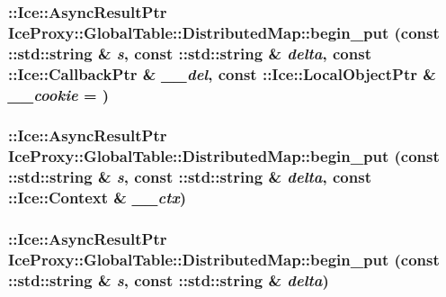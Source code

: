 \label{class_ice_proxy_1_1_global_table_1_1_distributed_map_a1f47f535d113d8ffad751119a6b7fbab}
\hypertarget{class_ice_proxy_1_1_global_table_1_1_distributed_map_a06f7ce73d60c5a24ffa4bd3f317b510b}{
\subsubsection[{begin\_\-put}]{\setlength{\rightskip}{0pt plus 5cm}::Ice::AsyncResultPtr IceProxy::GlobalTable::DistributedMap::begin\_\-put (const ::std::string \& {\em s}, \/  const ::std::string \& {\em delta}, \/  const ::Ice::CallbackPtr \& {\em \_\-\_\-del}, \/  const ::Ice::LocalObjectPtr \& {\em \_\-\_\-cookie} = {})}}
\label{class_ice_proxy_1_1_global_table_1_1_distributed_map_a06f7ce73d60c5a24ffa4bd3f317b510b}
\hypertarget{class_ice_proxy_1_1_global_table_1_1_distributed_map_a69018bd44d0fdfa426211d5f89c36d34}{
\subsubsection[{begin\_\-put}]{\setlength{\rightskip}{0pt plus 5cm}::Ice::AsyncResultPtr IceProxy::GlobalTable::DistributedMap::begin\_\-put (const ::std::string \& {\em s}, \/  const ::std::string \& {\em delta}, \/  const ::Ice::Context \& {\em \_\-\_\-ctx})}}
\label{class_ice_proxy_1_1_global_table_1_1_distributed_map_a69018bd44d0fdfa426211d5f89c36d34}
\hypertarget{class_ice_proxy_1_1_global_table_1_1_distributed_map_a3373fde3c2f8126148f819ff7dc10af6}{
\subsubsection[{begin\_\-put}]{\setlength{\rightskip}{0pt plus 5cm}::Ice::AsyncResultPtr IceProxy::GlobalTable::DistributedMap::begin\_\-put (const ::std::string \& {\em s}, \/  const ::std::string \& {\em delta})}}
